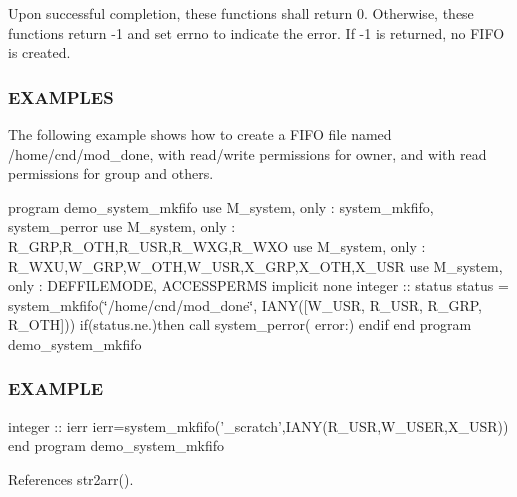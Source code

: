 Upon successful completion, these functions shall return 0. Otherwise, these functions return -\/1 and set errno to indicate the error. If -\/1 is returned, no F\+I\+FO is created.

\subsubsection*{E\+X\+A\+M\+P\+L\+ES}

The following example shows how to create a F\+I\+FO file named /home/cnd/mod\+\_\+done, with read/write permissions for owner, and with read permissions for group and others.

program demo\+\_\+system\+\_\+mkfifo use M\+\_\+system, only \+: system\+\_\+mkfifo, system\+\_\+perror use M\+\_\+system, only \+: R\+\_\+\+G\+RP,R\+\_\+\+O\+TH,R\+\_\+\+U\+SR,R\+\_\+\+W\+XG,R\+\_\+\+W\+XO use M\+\_\+system, only \+: R\+\_\+\+W\+XU,W\+\_\+\+G\+RP,W\+\_\+\+O\+TH,W\+\_\+\+U\+SR,X\+\_\+\+G\+RP,X\+\_\+\+O\+TH,X\+\_\+\+U\+SR use M\+\_\+system, only \+: D\+E\+F\+F\+I\+L\+E\+M\+O\+DE, A\+C\+C\+E\+S\+S\+P\+E\+R\+MS implicit none integer \+:\+: status status = system\+\_\+mkfifo(\char`\"{}/home/cnd/mod\+\_\+done\char`\"{}, I\+A\+N\+Y(\mbox{[}\+W\+\_\+\+U\+S\+R, R\+\_\+\+U\+S\+R, R\+\_\+\+G\+R\+P, R\+\_\+\+O\+T\+H\mbox{]})) if(status.\+ne.)then call system\+\_\+perror( error\+:\textquotesingle{}) endif end program demo\+\_\+system\+\_\+mkfifo

\subsubsection*{E\+X\+A\+M\+P\+LE}

\begin{DoxyVerb}integer :: ierr
ierr=system_mkfifo('_scratch',IANY(R_USR,W_USER,X_USR))
end program demo_system_mkfifo \end{DoxyVerb}
 

References str2arr().

